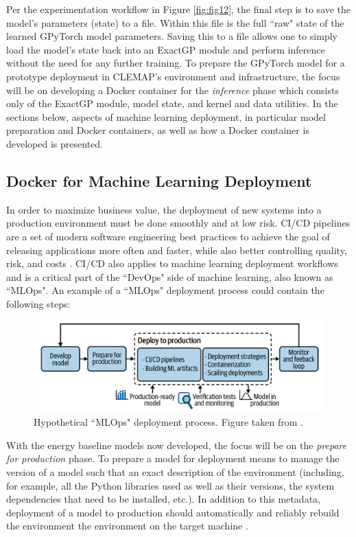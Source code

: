 Per the experimentation workflow in Figure \ref{fig:fig12}, the final step is to save the model's parameters (state) to a  file. Within this file is the full ``raw" state of the learned GPyTorch model parameters. Saving this to a file allows one to simply load the model's state back into an ExactGP module and perform inference without the need for any further training. To prepare the GPyTorch model for a prototype deployment in CLEMAP's environment and infrastructure, the focus will be on developing a Docker container for the \textit{inference} phase which consists only of the ExactGP module, model state, and kernel and data utilities. In the sections below, aspects of machine learning deployment, in particular model preparation and Docker containers, as well as how a Docker container is developed is presented.

\subsection{Docker for Machine Learning Deployment}

In order to maximize business value, the deployment of new systems into a production environment must be done smoothly and at low risk. \ac{CI/CD} pipelines are a set of modern software engineering best practices to achieve the goal of releasing applications more often and faster, while also better controlling quality, risk, and costs \cite{dreyfus-schmidt_introducing_2020}. CI/CD also applies to machine learning deployment workflows and is a critical part of the ``DevOps" side of machine learning, also known as ``MLOps". An example of a ``MLOps" deployment process could contain the following steps:

\begin{figure}[H]
\centering
\graphicspath{ {./images/} }
\includegraphics[scale=0.49]{images/ml_workflow.png}
\caption{Hypothetical ``MLOps" deployment process. Figure taken from \cite{dreyfus-schmidt_introducing_2020}.}
\label{fig:fig18}
\end{figure}

With the energy baseline models now developed, the focus will be on the \textit{prepare for production} phase. To prepare a model for deployment means to manage the version of a model such that an exact description of the environment (including, for example, all the Python libraries used as well as their versions, the system dependencies that need to be installed, etc.). In addition to this metadata, deployment of a model to production should automatically and reliably rebuild the environment the environment on the target machine \cite{dreyfus-schmidt_introducing_2020}. 


